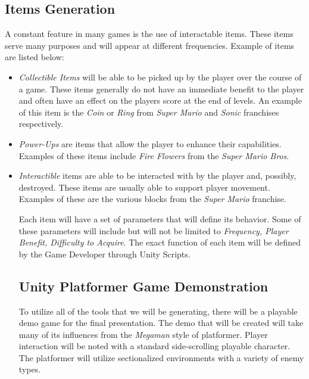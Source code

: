 \documentclass[pdftex,12pt,letter]{article}
\begin{document}
\begin{itemize}
\begin{itemize}
\subsection{Items Generation}
A constant feature in many games is the use of interactable items. These items serve many purposes and will appear at different frequencies. Example of items are listed below:
\begin{itemize}
\item \textit{Collectible Items} will be able to be picked up by the player over the course of a game. These items generally do not have an immediate benefit to the player and often have an effect on the players score at the end of levels. An example of this item is the \textit{Coin} or \textit{Ring} from \textit{Super Mario} and \textit{Sonic} franchises respectively. 

\item \textit{Power-Ups} are items that allow the player to enhance their capabilities. Examples of these items include \textit{Fire Flowers} from the \textit{Super Mario Bros}.

\item \textit{Interactible} items are able to be interacted with by the player and, possibly, destroyed. These items are usually able to support player movement. Examples of these are the various blocks from the \textit{Super Mario} franchise. \\

\endgroup

Each item will have a set of parameters that will define its behavior. Some of these parameters will include but will not be limited to \textit{Frequency, Player Benefit, Difficulty to Acquire}. The exact function of each item will be defined by the Game Developer through Unity Scripts. 
\\

\subsection{Unity Platformer Game Demonstration}
To utilize all of the tools that we will be generating, there will be a playable demo game for the final presentation. The demo that will be created will take many of its influences from the \textit{Megaman} style of platformer.  Player interaction will be noted with a standard side-scrolling playable character. The platformer will utilize sectionalized environments with a variety of enemy types. 
\\



\end{itemize}
\end{itemize}
\end{itemize}
\end{document}
